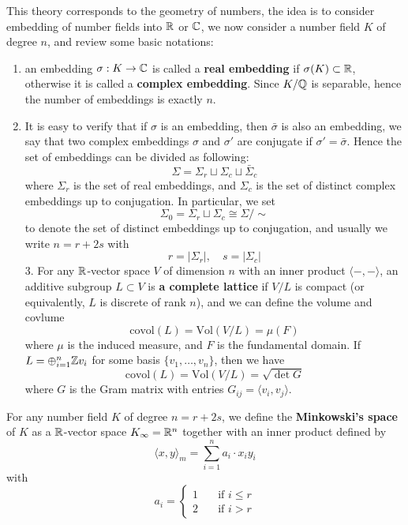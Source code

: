 This theory corresponds to the geometry of numbers, the idea is to consider embedding of number fields into \(\mathbb{R}\) or \(\mathbb{C}\), we now consider a number field \(K\) of degree \(n\), and review some basic notations:
    \begin{enumerate}
        \item an embedding \(\sigma: K \to \mathbb{C}\) is called a \textbf{real embedding} if \(\sigma(K) \subset \mathbb{R}\), otherwise it is called a \textbf{complex embedding}. Since \(K/\mathbb{Q}\) is separable, hence the number of embeddings is exactly \(n\).
        \item It is easy to verify that if \(\sigma\) is an embedding, then \(\bar{\sigma}\) is also an embedding, we say that two complex embeddings \(\sigma\) and \(\sigma'\) are conjugate if
        \(\sigma' = \bar{\sigma}\). Hence the set of embeddings can be divided as following:
        \[\Sigma = \Sigma_r \sqcup \Sigma_c \sqcup \bar{\Sigma}_c\]
        where \(\Sigma_r\) is the set of real embeddings, and \(\Sigma_c\) is the set of distinct complex embeddings up to conjugation. In particular, we set 
        \[\Sigma_0 = \Sigma_r \sqcup \Sigma_c \cong \Sigma / \sim\]
        to denote the set of distinct embeddings up to conjugation, and usually we write \(n = r+2s\) with
        \[r=|\Sigma_r|, \quad s = |\Sigma_c|\]
        3. For any \(\mathbb{R}\)-vector space \(V\) of dimension \(n\) with an inner product \(\langle -,- \rangle\), an additive subgroup \(L \subset V\) is \textbf{a complete lattice} if \(V/L\) is compact (or equivalently, \(L\) is discrete of rank \(n\)), and we can define the volume and covlume
        \[\mathrm{covol}(L) = \mathrm{Vol}(V/L) = \mu(F)\]
        where \(\mu\) is the induced measure, and \(F\) is the fundamental domain. If \(L = \oplus_{i=1}^n \mathbb{Z} v_i\) for some basis \(\{v_1, \ldots, v_n\}\), then we have 
        \[\mathrm{covol}(L) =\mathrm{Vol}(V/L) = \sqrt{\det G}\]
        where \(G\) is the Gram matrix with entries \(G_{ij} = \langle v_i, v_j \rangle\).
    \end{enumerate}

    \begin{definition}
        For any number field \(K\) of degree \(n=r+2s\), we define the \textbf{Minkowski's space} of \(K\) as a \(\mathbb{R}\)-vector space \(K_{\infty} = \mathbb{R}^n\) together with an inner product defined by
        \[\langle x,y \rangle_m = \sum_{i=1}^n a_i \cdot x_iy_i\]
        with \[a_i = \begin{cases}
            1 \quad &\text{if } i \leq r\\
            2 \quad &\text{if } i > r
        \end{cases}\]
    \end{definition}

